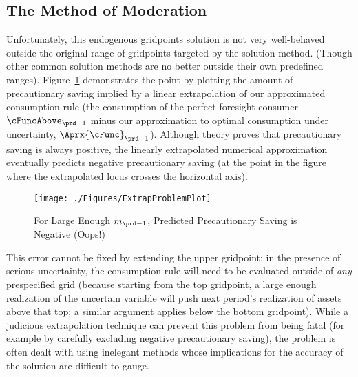 \hypertarget{the-method-of-moderation}{}
\subsection{The Method of Moderation}\label{sec:method-of-moderation}

  Unfortunately, this endogenous gridpoints solution is not very
  well-behaved outside the original range of gridpoints targeted by
  the solution method.  (Though other common solution methods are no
  better outside their own predefined ranges).
  Figure~\ref{fig:ExtrapProblem} demonstrates the point by plotting
  the amount of precautionary saving implied by a linear extrapolation
  of our approximated consumption rule (the consumption of the perfect
  foresight consumer $\cFuncAbove_{\prd-1}$ minus our approximation to
  optimal consumption under uncertainty, $\Aprx{\cFunc}_{\prd-1}$).
  Although theory proves that precautionary saving is always positive,
  the linearly extrapolated numerical approximation eventually
  predicts negative precautionary saving (at the point in the figure
  where the extrapolated locus crosses the horizontal axis).

  \hypertarget{ExtrapProblemPlot}{}
  \begin{figure}
    \texttt{[image: ./Figures/ExtrapProblemPlot]}
    \caption{For Large Enough ${m}_{\prd-1}$, Predicted Precautionary Saving is Negative (Oops!)}
    \label{fig:ExtrapProblem}
  \end{figure}

  This error cannot be fixed by extending the upper gridpoint; in the presence of serious uncertainty, the consumption rule will need to be evaluated outside of \textit{any} prespecified grid (because starting from the top gridpoint, a large enough realization of the uncertain variable will push next period's realization of assets above that top; a similar argument applies below the bottom gridpoint).  While a judicious extrapolation technique can prevent this problem from being fatal (for example by carefully excluding negative precautionary saving), the problem is often dealt with using inelegant methods whose implications for the accuracy of the solution are difficult to gauge.



